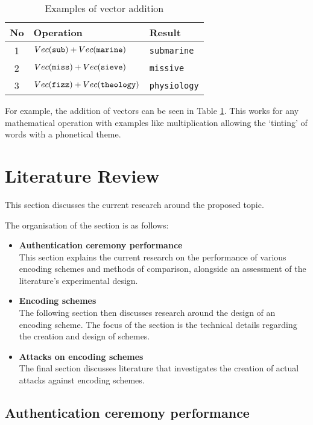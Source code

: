 \begin{table}[!htb]
    \centering
    \begin{tabular}{cll}
        No & Operation & Result \\
        \hline
        1  & $Vec(\verb|sub|) + Vec(\verb|marine|)$ & \verb|submarine| \\
        2  & $Vec(\verb|miss|) + Vec(\verb|sieve|)$ & \verb|missive| \\
        3  & $Vec(\verb|fizz|) + Vec(\verb|theology|)$ & \verb|physiology| \\
    \end{tabular}
    \caption{Examples of vector addition}
    \label{tab:vectorAdd}
\end{table}

For example, the addition of vectors can be seen in Table \ref{tab:vectorAdd}. This works for any mathematical operation with examples like multiplication allowing the `tinting' of words with a phonetical theme.



\section{Literature Review}
This section discusses the current research around the proposed topic.

The organisation of the section is as follows:

\begin{itemize}
    \item \textbf{Authentication ceremony performance} \\
    This section explains the current research on the performance of various encoding schemes and methods of comparison, alongside an assessment of the literature's experimental design.

    \item \textbf{Encoding schemes} \\
    The following section then discusses research around the design of an encoding scheme. The focus of the section is the technical details regarding the creation and design of schemes. 

    \item \textbf{Attacks on encoding schemes} \\
    The final section discusses literature that investigates the creation of actual attacks against encoding schemes.
\end{itemize}

\subsection{Authentication ceremony performance}


